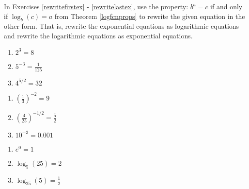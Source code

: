 \documentclass{ximera}
\begin{document}
	\author{Stitz-Zeager}



\label{ExercisesforLogarithmicFunctions}

\label{IntroExpLogsExercises}

In Exercises \ref{rewritefirstex} - \ref{rewritelastex}, use the property: $b^{a} = c$ if and only if $\log_{b}(c) = a$ from Theorem \ref{logfcnprops} to rewrite the given equation in the other form.  That is, rewrite the exponential equations as logarithmic equations and rewrite the logarithmic equations as exponential equations.

\begin{multicols}{3}
\begin{enumerate}

\item  $2^{3} = 8$ \label{rewritefirstex}

\item  $5^{-3} = \frac{1}{125}$  

\item  $4^{5/2} = 32$  

\setcounter{HW}{\value{enumi}}
\end{enumerate}
\end{multicols}

\begin{multicols}{3}
\begin{enumerate}
\setcounter{enumi}{\value{HW}}

\item  $\left(\frac{1}{3}\right)^{-2} = 9$  

\item  $\left(\frac{4}{25}\right)^{-1/2} = \frac{5}{2}$  

\item  $10^{-3} = 0.001$ 

\setcounter{HW}{\value{enumi}}
\end{enumerate}
\end{multicols}

\begin{multicols}{3}
\begin{enumerate}
\setcounter{enumi}{\value{HW}}

\item  $e^{0}  = 1$  

\item  $\log_{5}(25) = 2$  

\item  $\log_{25} (5) = \frac{1}{2}$  

\setcounter{HW}{\value{enumi}}
\end{enumerate}
\end{multicols}
\end{document}
